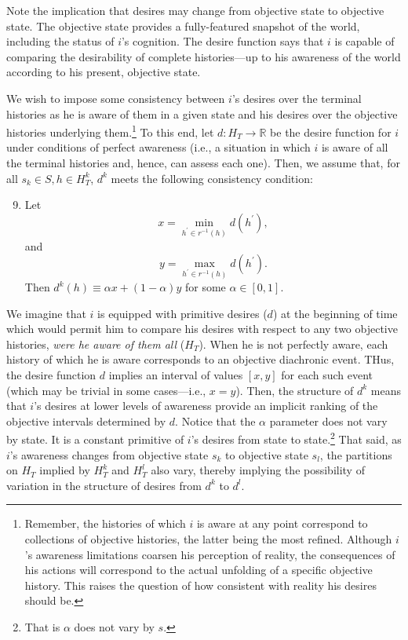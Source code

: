 \documentclass[
11pt,
titlepage,
reqno,
]{article}%
\theoremstyle{definition}
\begin{document}
Note the implication that desires may change from objective state to objective state.
The objective state provides a fully-featured snapshot of the world, including the status of $i$'s cognition. 
The desire function says that $i$ is capable of comparing the desirability of complete histories---up to his awareness of the world according to his present, objective state.

We wish to impose some consistency between $i$'s desires over the terminal histories as he is aware of them in a given state and his desires over the objective histories underlying them.\footnote
{
	Remember, the histories of which $i$ is aware at any point correspond to collections of objective histories, the latter being the most refined. 
	Although $i$'s awareness limitations coarsen his perception of reality, the consequences of his actions will correspond to the actual unfolding of a specific objective history. 
	This raises the question of how consistent with reality his desires should be.
}
To this end, let $d:H_T\rightarrow \mathbb{R}$ be the desire function for $i$ under conditions of perfect awareness (i.e., a situation in which $i$ is aware of all the terminal histories and, hence, can assess each one).
Then, we assume that, for all $s_k\in S,h\in H^k_T$, $d^k$ meets the following consistency condition:
\begin{enumerate}
	\setcounter{enumi}{8}
	\item Let 
	\[
		x=\min_{h^\prime\in r^{-1}(h)}d(h^\prime),
	\]
	 and  
	 \[
	 	y=\max_{h^\prime\in r^{-1}(h)}d(h^\prime).
	 \]
	 Then $d^k(h)\equiv\alpha x + (1-\alpha)y$ for some $\alpha\in[0,1]$. 
\end{enumerate}
We imagine that $i$ is equipped with primitive desires ($d$) at the beginning of time which would permit him to compare his desires with respect to any two objective histories, \textit{were he aware of them all} ($H_T$).
When he is not perfectly aware, each history of which he is aware corresponds to an objective diachronic event.
THus, the desire function $d$ implies an interval of values $[x,y]$ for each such event (which may be trivial in some cases---i.e., $x=y$).
Then, the structure of $d^k$ means that $i$'s desires at lower levels of awareness provide an implicit ranking of the objective intervals determined by   $d$.
Notice that the $\alpha$ parameter does not vary by state. 
It is a constant primitive of $i$'s desires from state to state.\footnote
{
	That is $\alpha$ does not vary by $s$.
}
That said, as $i$'s awareness  changes from objective state $s_k$ to objective state $s_l$, the partitions on $H_T$ implied by $H^k_T$ and $H^l_T$ also vary, thereby implying the possibility of variation in the structure of desires from $d^k$ to $d^l$. 
\end{document}

